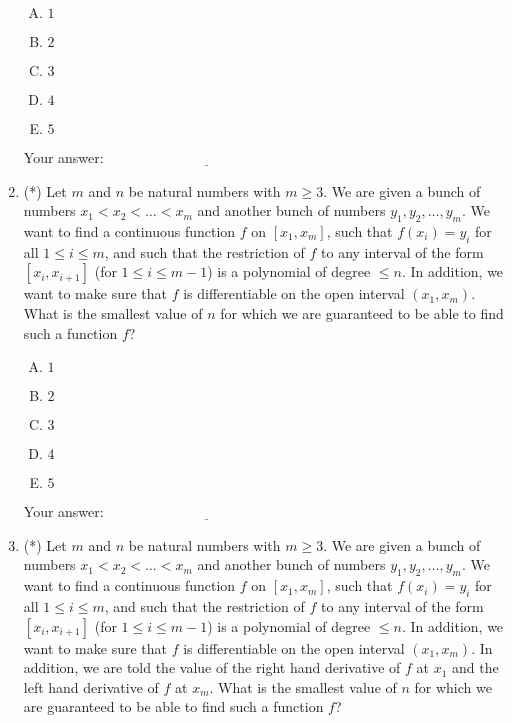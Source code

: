 \documentclass[10pt]{amsart}
\begin{document}
\begin{enumerate}
  \begin{enumerate}[(A)]
  \item $1$
  \item $2$
  \item $3$
  \item $4$
  \item $5$
  \end{enumerate}

  \vspace{0.1in}
  Your answer: $\underline{\qquad\qquad\qquad\qquad\qquad\qquad\qquad}$
  \vspace{0.1in}

\item (*) Let $m$ and $n$ be natural numbers with $m \ge 3$. We are
  given a bunch of numbers $x_1< x_2< \dots<x_m$ and another bunch of
  numbers $y_1,y_2,\dots,y_m$. We want to find a continuous function
  $f$ on $[x_1,x_m]$, such that $f(x_i) = y_i$ for all $1 \le i \le
  m$, and such that the restriction of $f$ to any interval of the form
  $[x_i,x_{i+1}]$ (for $1 \le i \le m - 1$) is a polynomial of degree
  $\le n$. In addition, we want to make sure that $f$ is
  differentiable on the open interval $(x_1,x_m)$. What is the
  smallest value of $n$ for which we are guaranteed to be able to find
  such a function $f$?

  \begin{enumerate}[(A)]
  \item $1$
  \item $2$
  \item $3$
  \item $4$
  \item $5$
  \end{enumerate}

  \vspace{0.1in}
  Your answer: $\underline{\qquad\qquad\qquad\qquad\qquad\qquad\qquad}$
  \vspace{0.1in}

\item (*) Let $m$ and $n$ be natural numbers with $m \ge 3$. We are given
  a bunch of numbers $x_1< x_2< \dots<x_m$ and another bunch of
  numbers $y_1,y_2,\dots,y_m$. We want to find a continuous function
  $f$ on $[x_1,x_m]$, such that $f(x_i) = y_i$ for all $1 \le i \le
  m$, and such that the restriction of $f$ to any interval of the form
  $[x_i,x_{i+1}]$ (for $1 \le i \le m - 1$) is a polynomial of degree
  $\le n$. In addition, we want to make sure that $f$ is
  differentiable on the open interval $(x_1,x_m)$. In addition, we are
  told the value of the right hand derivative of $f$ at $x_1$ and the
  left hand derivative of $f$ at $x_m$. What is the smallest value of
  $n$ for which we are guaranteed to be able to find such a function
  $f$?


\end{enumerate}
\end{document}
